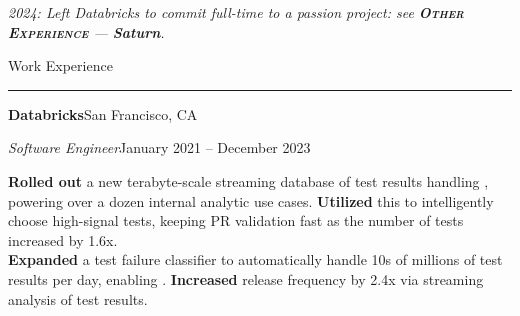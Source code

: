 












  \emph{2024: Left Databricks to commit full-time to a passion project: see \textbf{\scshape{}Other Experience} --- \textbf{Saturn}.}

  \vspace{5pt}

  {\sectionfont Work Experience\vspace{2pt}\hrule}

  \vspace{5pt}
  \textbf{Databricks}\quad{}\hfill San Francisco, CA
  \begin{adjustwidth}{10pt}{}
    \emph{Software Engineer}\hfill January 2021 -- December 2023

    \textbf{Rolled out} a new terabyte-scale streaming database of test results handling , powering over a dozen internal analytic use cases.
    \textbf{Utilized} this to intelligently choose high-signal tests, keeping PR validation fast as the number of tests increased by 1.6x.\\
    \textbf{Expanded} a test failure classifier to automatically handle 10s of millions of test results per day, enabling .
    \textbf{Increased} release frequency by 2.4x via streaming analysis of test results.
  \end{adjustwidth}

